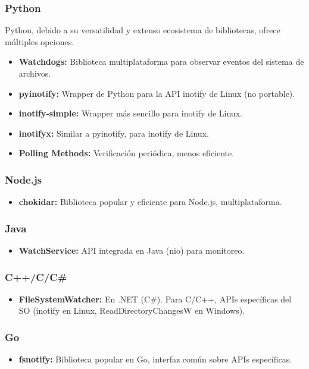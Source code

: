 \subsubsection{Python}
Python, debido a su versatilidad y extenso ecosistema de bibliotecas, ofrece múltiples opciones.
\begin{itemize}
    \item \textbf{Watchdogs:} Biblioteca multiplataforma para observar eventos del sistema de archivos.
    \item \textbf{pyinotify:} Wrapper de Python para la API inotify de Linux (no portable).
    \item \textbf{inotify-simple:} Wrapper más sencillo para inotify de Linux.
    \item \textbf{inotifyx:} Similar a pyinotify, para inotify de Linux.
    \item \textbf{Polling Methods:} Verificación periódica, menos eficiente.
\end{itemize}

\subsubsection{Node.js}
\begin{itemize}
    \item \textbf{chokidar:} Biblioteca popular y eficiente para Node.js, multiplataforma.
\end{itemize}

\subsubsection{Java}
\begin{itemize}
    \item \textbf{WatchService:} API integrada en Java (\gls{nio}) para monitoreo.
\end{itemize}

\subsubsection{C++/C/C\#}
\begin{itemize}
    \item \textbf{FileSystemWatcher:} En .NET (C\#). Para C/C++, APIs específicas del SO (inotify en Linux, ReadDirectoryChangesW en Windows).
\end{itemize}

\subsubsection{Go}
\begin{itemize}
    \item \textbf{fsnotify:} Biblioteca popular en Go, interfaz común sobre APIs específicas.
\end{itemize}

